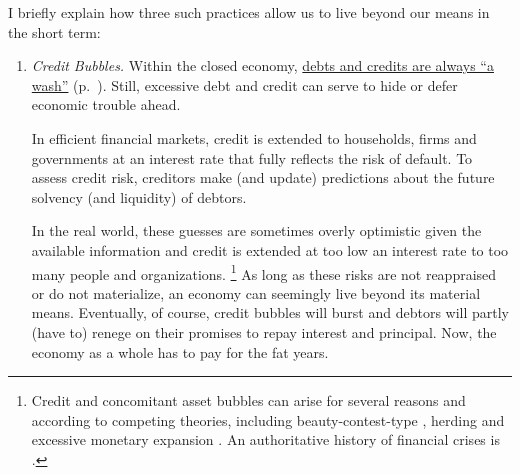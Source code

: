 I briefly explain how three such practices allow us to live beyond our means in the short term:

\begin{enumerate}
	\item \emph{Credit Bubbles.}
		\label{itm:credit-bubbles}
	Within the closed economy, \hyperref[itm:credits-debits-wash]{debts and credits are always ``a wash''} (p.~\pageref{itm:credits-debits-wash}).
	Still, excessive debt and credit can serve to hide or defer economic trouble ahead.

	In efficient financial markets, credit is extended to households, firms and governments at an interest rate that fully reflects the risk of default.
	To assess credit risk, creditors make (and update) predictions about the future solvency (and liquidity) of debtors.

	In the real world, these guesses are sometimes overly optimistic given the available information and credit is extended at too low an interest rate to too many people and organizations.
	\footnote{
		Credit and concomitant asset bubbles can arise for several reasons and according to competing theories, including beauty-contest-type \citep{Keynes1936}, herding \citep{Banerjee-1992-aa} and excessive monetary expansion \citep{Stiglitz2010}.
		An authoritative history of financial crises is \cite{KindlebergerAliber-2005-aa}.
	}
	As long as these risks are not reappraised or do not materialize, an economy can seemingly live beyond its material means.
	Eventually, of course, credit bubbles will burst and debtors will partly (have to) renege on their promises to repay interest and principal.
	Now, the economy as a whole has to pay for the fat years.


\end{enumerate}
